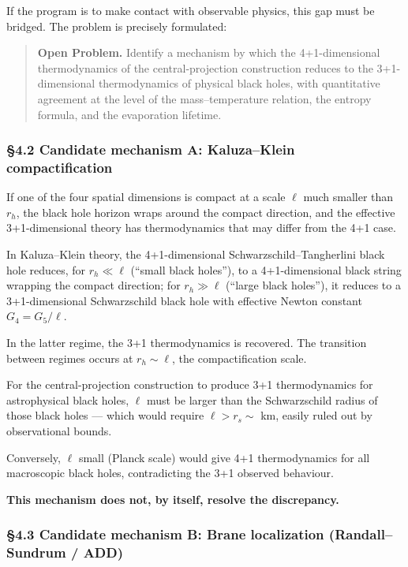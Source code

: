 \documentclass[a4paper,11pt]{article}
\theoremstyle{definition}
\begin{document}
If the program is to make contact with observable physics, this gap must
be bridged. The problem is precisely formulated:

\begin{quote}
\textbf{Open Problem.} Identify a mechanism by which the 4+1-dimensional
thermodynamics of the central-projection construction reduces to the
3+1-dimensional thermodynamics of physical black holes, with
quantitative agreement at the level of the mass--temperature relation,
the entropy formula, and the evaporation lifetime.
\end{quote}

\subsubsection{§4.2 Candidate mechanism A: Kaluza--Klein
compactification}\label{candidate-mechanism-a-kaluzaklein-compactification}

If one of the four spatial dimensions is compact at a scale \(\ell\)
much smaller than \(r_h\), the black hole horizon wraps around the
compact direction, and the effective 3+1-dimensional theory has
thermodynamics that may differ from the 4+1 case.

In Kaluza--Klein theory, the 4+1-dimensional Schwarzschild--Tangherlini
black hole reduces, for \(r_h \ll \ell\) (``small black holes''), to a
4+1-dimensional black string wrapping the compact direction; for
\(r_h \gg \ell\) (``large black holes''), it reduces to a
3+1-dimensional Schwarzschild black hole with effective Newton constant
\(G_4 = G_5/\ell\).

In the latter regime, the 3+1 thermodynamics is recovered. The
transition between regimes occurs at \(r_h \sim \ell\), the
compactification scale.

For the central-projection construction to produce 3+1 thermodynamics
for astrophysical black holes, \(\ell\) must be larger than the
Schwarzschild radius of those black holes --- which would require
\(\ell > r_s \sim\) km, easily ruled out by observational bounds.

Conversely, \(\ell\) small (Planck scale) would give 4+1 thermodynamics
for all macroscopic black holes, contradicting the 3+1 observed
behaviour.

\textbf{This mechanism does not, by itself, resolve the discrepancy.}

\subsubsection{§4.3 Candidate mechanism B: Brane localization
(Randall--Sundrum /
ADD)}\label{candidate-mechanism-b-brane-localization-randallsundrum-add}
\end{document}
